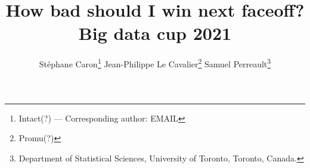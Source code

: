 \usepackage{bbm}

\usepackage{fancyhdr}

\pagestyle{fancy}
\fancyhf{}
\renewcommand{\headrulewidth}{0pt} %
\rfoot{\thepage}

\usepackage[margin=1in]{geometry}

\usepackage{multicol}

\usepackage{hyperref}
\usepackage{xcolor}


\title{How bad should I win next faceoff?\\ {\normalsize Big data cup 2021}}


\author{
Stéphane Caron\footnote{Intact(?) --- Corresponding author: EMAIL} \qquad
Jean-Philippe Le Cavalier\footnote{Promu(?)}  \qquad
Samuel Perreault\footnote{Department of Statistical Sciences, University of Toronto, Toronto, Canada.}
}

